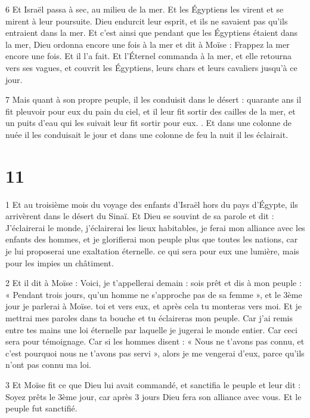 \par 6 Et Israël passa à sec, au milieu de la mer. Et les Égyptiens les virent et se mirent à leur poursuite. Dieu endurcit leur esprit, et ils ne savaient pas qu'ils entraient dans la mer. Et c'est ainsi que pendant que les Égyptiens étaient dans la mer, Dieu ordonna encore une fois à la mer et dit à Moïse : Frappez la mer encore une fois. Et il l’a fait. Et l'Éternel commanda à la mer, et elle retourna vers ses vagues, et couvrit les Égyptiens, leurs chars et leurs cavaliers jusqu'à ce jour.

\par 7 Mais quant à son propre peuple, il les conduisit dans le désert : quarante ans il fit pleuvoir pour eux du pain du ciel, et il leur fit sortir des cailles de la mer, et un puits d'eau qui les suivait leur fit sortir pour eux. . Et dans une colonne de nuée il les conduisait le jour et dans une colonne de feu la nuit il les éclairait.

\chapter{11}

\par 1 Et au troisième mois du voyage des enfants d'Israël hors du pays d'Égypte, ils arrivèrent dans le désert du Sinaï. Et Dieu se souvint de sa parole et dit : J'éclairerai le monde, j'éclairerai les lieux habitables, je ferai mon alliance avec les enfants des hommes, et je glorifierai mon peuple plus que toutes les nations, car je lui proposerai une exaltation éternelle. ce qui sera pour eux une lumière, mais pour les impies un châtiment.

\par 2 Et il dit à Moïse : Voici, je t'appellerai demain : sois prêt et dis à mon peuple : « Pendant trois jours, qu'un homme ne s'approche pas de sa femme », et le 3ème jour je parlerai à Moïse. toi et vers eux, et après cela tu monteras vers moi. Et je mettrai mes paroles dans ta bouche et tu éclaireras mon peuple. Car j'ai remis entre tes mains une loi éternelle par laquelle je jugerai le monde entier. Car ceci sera pour témoignage. Car si les hommes disent : « Nous ne t’avons pas connu, et c’est pourquoi nous ne t’avons pas servi », alors je me vengerai d’eux, parce qu’ils n’ont pas connu ma loi.

\par 3 Et Moïse fit ce que Dieu lui avait commandé, et sanctifia le peuple et leur dit : Soyez prêts le 3ème jour, car après 3 jours Dieu fera son alliance avec vous. Et le peuple fut sanctifié.

